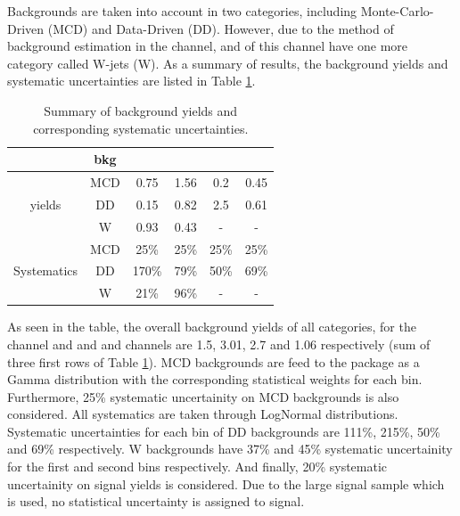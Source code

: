 Backgrounds are taken into account in two categories, including Monte-Carlo-Driven (MCD) and Data-Driven (DD).
However, due to the method of background estimation in the \tauTau channel, \binone and \bintwo of this channel have one more category called W-jets (W).
As a summary of results, the background yields and systematic uncertainties are listed in Table \ref{tbl:yieldSysSummary}.
\begin{table}[h]
\begin{center}
\begin{tabular}{c|c|c|c|c|c}
\hline
\hline
	& bkg	& \tauTau\binone & \tauTau\bintwo & \eTau\binone & \muTau\binone \\
\hline
\hline
\multirow{3}{*}{yields} &MCD  & 0.75  & 1.56 & 0.2 & 0.45 \\
                        &DD   & 0.15  & 0.82 & 2.5 & 0.61 \\
                        &W    & 0.93  & 0.43 &  -  &  -  \\
\hline
\multirow{3}{*}{Systematics}&MCD  & 25\%   &   25\% & 25\% & 25\% \\
                            &DD   & 170\%  &   79\% & 50\% & 69\% \\
                            &W    & 21\%   &   96\% &   -  & - \\
\hline
\hline
\end{tabular}
\caption{Summary of background yields and corresponding systematic uncertainties.}
\label{tbl:yieldSysSummary}
\end{center}
\end{table}
As seen in the table, the overall background yields of all categories, for the \tauTau channel \binone and \bintwo and \eTau and \muTau channels are  1.5, 3.01, 2.7 and 1.06 respectively (sum of three first rows of Table \ref{tbl:yieldSysSummary}).
MCD backgrounds are feed to the package as a Gamma distribution with the corresponding statistical weights for each bin.
Furthermore, 25\% systematic uncertainity on MCD backgrounds is also considered.
All systematics are taken through LogNormal distributions.
Systematic uncertainties for each bin of DD backgrounds are 111\%, 215\%, 50\% and 69\% respectively.  
W backgrounds have 37\% and 45\% systematic uncertainity for the first and second bins respectively.
And finally, 20\% systematic uncertainity on signal yields is considered. Due to the large signal sample
which is used, no statistical uncertainty is assigned to signal.


